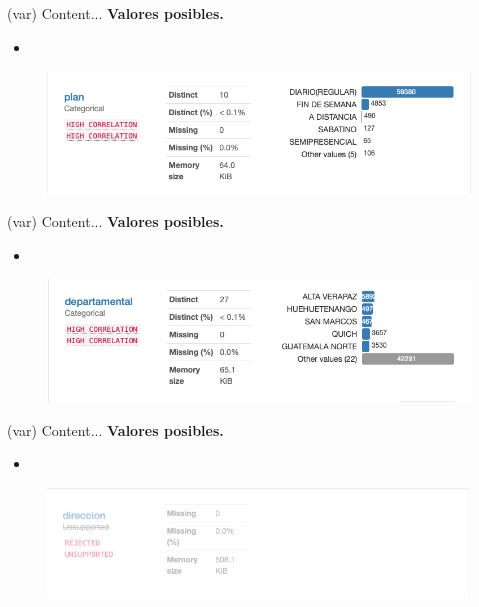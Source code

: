 
\begin{variable}(var) 
Content... 
\bigbreak 
\textbf{Valores posibles.}
\begin{itemize}
	\item 
\end{itemize}
\begin{figure}[H]
	\centering
	\includegraphics[scale=0.5]{Images/14}
\end{figure}
\end{variable}


\begin{variable}(var) 
Content... 
\bigbreak 
\textbf{Valores posibles.}
\begin{itemize}
	\item 
\end{itemize}
\begin{figure}[H]
	\centering
	\includegraphics[scale=0.5]{Images/15}
\end{figure}
\end{variable}


\begin{variable}(var) 
Content... 
\bigbreak 
\textbf{Valores posibles.}
\begin{itemize}
	\item 
\end{itemize}
\begin{figure}[H]
	\centering
	\includegraphics[scale=0.5]{Images/16}
\end{figure}
\end{variable}

